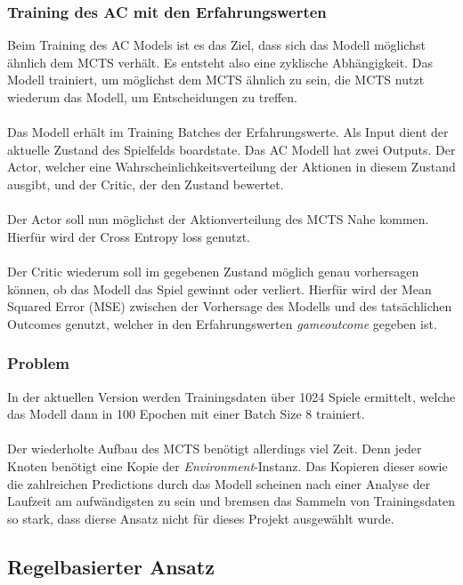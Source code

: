 \subsubsection*{Training des AC mit den Erfahrungswerten}
Beim Training des AC Models ist es das Ziel, dass sich das Modell möglichst ähnlich dem MCTS verhält. Es entsteht also eine zyklische Abhängigkeit. Das Modell trainiert, um möglichst dem MCTS ähnlich zu sein, die MCTS nutzt wiederum das Modell, um Entscheidungen zu treffen. 
\\\\
Das Modell erhält im Training Batches der Erfahrungswerte. Als Input dient der aktuelle Zustand des Spielfelds board\textunderscore{}state. Das AC Modell hat zwei Outputs. Der Actor, welcher eine Wahrscheinlichkeitsverteilung der Aktionen in diesem Zustand ausgibt, und der Critic, der den Zustand bewertet. 
\\\\
Der Actor soll nun möglichst der Aktionverteilung des MCTS Nahe kommen. Hierfür wird der Cross Entropy loss genutzt.
\\\\
Der Critic wiederum soll im gegebenen Zustand möglich genau vorhersagen können, ob das Modell das Spiel gewinnt oder verliert. Hierfür wird der Mean Squared Error (MSE) zwischen der Vorhersage des Modells und des tatsächlichen Outcomes genutzt, welcher in den Erfahrungswerten \textit{game\textunderscore{}outcome} gegeben ist.

\subsubsection*{Problem}
In der aktuellen Version werden Trainingsdaten über 1024 Spiele ermittelt, welche das Modell dann in 100 Epochen mit einer Batch Size 8 trainiert.
\\\\
Der wiederholte Aufbau des MCTS benötigt allerdings viel Zeit. Denn jeder Knoten benötigt eine Kopie der \textit{Environment}-Instanz. Das Kopieren dieser sowie die zahlreichen Predictions durch das Modell scheinen nach einer Analyse der Laufzeit am aufwändigsten zu sein und bremsen das Sammeln von Trainingsdaten so stark, dass dierse Ansatz nicht für dieses Projekt ausgewählt wurde.

\subsection{Regelbasierter Ansatz}

